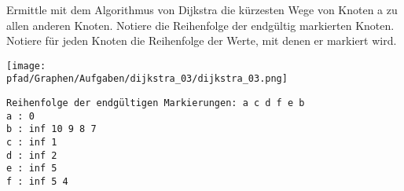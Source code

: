 ﻿\question[6]
Ermittle mit dem Algorithmus von Dijkstra die kürzesten Wege von Knoten a zu allen anderen
Knoten.  Notiere die Reihenfolge der endgültig markierten Knoten.
Notiere für jeden Knoten die Reihenfolge der Werte, mit denen er markiert wird.

\texttt{[image: \\pfad/Graphen/Aufgaben/dijkstra\_03/dijkstra\_03.png]}
\begin{solutionbox}{5cm}
\begin{lstlisting}
Reihenfolge der endgültigen Markierungen: a c d f e b
a : 0
b : inf 10 9 8 7
c : inf 1
d : inf 2
e : inf 5
f : inf 5 4
\end{lstlisting}
\end{solutionbox}
